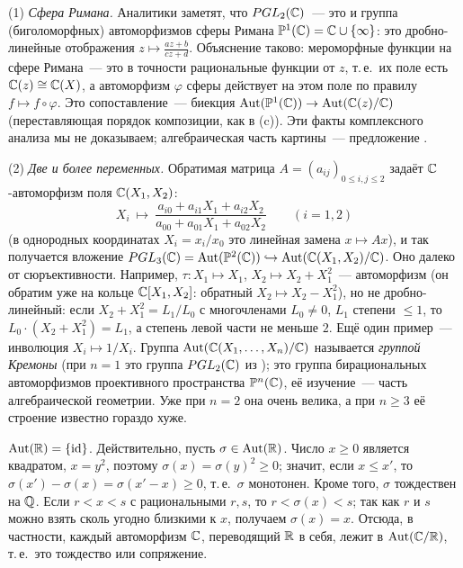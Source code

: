 \begin{aside}[3.1c]
(1) \emph{Сфера Римана.} Аналитики заметят, что $PGL_2(\mathbb C)$~--- это и группа (биголоморфных) автоморфизмов сферы
Римана $\mathbb P^1(\mathbb C)=\mathbb C\cup\{\infty\}$: это дробно-линейные отображения $z\mapsto\frac{az+b}{cz+d}$. Объяснение таково:
мероморфные функции на сфере Римана~--- это в точности рациональные функции от $z$, т.\,е.\ их поле есть $\mathbb C(z)\cong\mathbb C(X)$,
а автоморфизм $\varphi$ сферы действует на этом поле по правилу $f\mapsto f\circ\varphi$. Это сопоставление~--- биекция
$\operatorname{Aut}(\mathbb P^1(\mathbb C))\to\operatorname{Aut}(\mathbb C(z)/\mathbb C)$ (переставляющая порядок композиции, как в (c)). Эти факты комплексного
анализа мы не доказываем; алгебраическая часть картины~--- предложение .

(2) \emph{Две и более переменных.} Обратимая матрица $A=(a_{ij})_{0\le i,j\le2}$ задаёт $\mathbb C$-автоморфизм поля
$\mathbb C(X_1,X_2)$:
\[
X_i\ \mapsto\ \frac{a_{i0}+a_{i1}X_1+a_{i2}X_2}{a_{00}+a_{01}X_1+a_{02}X_2}\qquad(i=1,2)
\]
(в однородных координатах $X_i=x_i/x_0$ это линейная замена $x\mapsto Ax$), и так получается вложение
$PGL_3(\mathbb C)=\operatorname{Aut}(\mathbb P^2(\mathbb C))\hookrightarrow\operatorname{Aut}(\mathbb C(X_1,X_2)/\mathbb C)$. Оно далеко от сюръективности. Например,
$\tau\colon X_1\mapsto X_1$, $X_2\mapsto X_2+X_1^2$~--- автоморфизм (он обратим уже на кольце $\mathbb C[X_1,X_2]$: обратный
$X_2\mapsto X_2-X_1^2$), но не дробно-линейный: если $X_2+X_1^2=L_1/L_0$ с многочленами $L_0\ne0$, $L_1$ степени $\le1$, то
$L_0\cdot(X_2+X_1^2)=L_1$, а степень левой части не меньше $2$. Ещё один пример~--- инволюция $X_i\mapsto1/X_i$. Группа
$\operatorname{Aut}(\mathbb C(X_1,\dots,X_n)/\mathbb C)$ называется \emph{группой Кремоны} (при $n=1$ это группа $PGL_2(\mathbb C)$ из ); это группа бирациональных автоморфизмов
проективного пространства $\mathbb P^n(\mathbb C)$, её изучение~--- часть алгебраической геометрии. Уже при $n=2$ она очень
велика, а при $n\ge3$ её строение известно гораздо хуже.
\end{aside}

\begin{example}[3.1d]
$\operatorname{Aut}(\mathbb R)=\{\operatorname{id}\}$. Действительно, пусть $\sigma\in\operatorname{Aut}(\mathbb R)$. Число $x\ge0$ является квадратом, $x=y^2$, поэтому
$\sigma(x)=\sigma(y)^2\ge0$; значит, если $x\le x'$, то $\sigma(x')-\sigma(x)=\sigma(x'-x)\ge0$, т.\,е.\ $\sigma$ монотонен. Кроме того, $\sigma$
тождествен на $\mathbb Q$. Если $r<x<s$ с рациональными $r,s$, то $r<\sigma(x)<s$; так как $r$ и $s$ можно взять сколь угодно
близкими к $x$, получаем $\sigma(x)=x$. Отсюда, в частности, каждый автоморфизм $\mathbb C$, переводящий $\mathbb R$ в себя, лежит в
$\operatorname{Aut}(\mathbb C/\mathbb R)$, т.\,е.\ это тождество или сопряжение.
\end{example}

